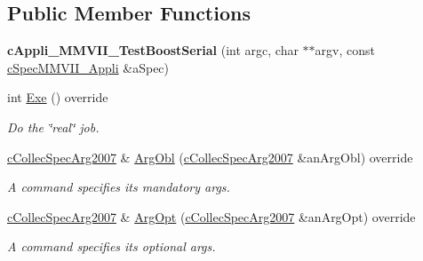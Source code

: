 \subsection*{Public Member Functions}
\begin{DoxyCompactItemize}
\item 
{\bfseries c\+Appli\+\_\+\+M\+M\+V\+I\+I\+\_\+\+Test\+Boost\+Serial} (int argc, char $\ast$$\ast$argv, const \hyperlink{classMMVII_1_1cSpecMMVII__Appli}{c\+Spec\+M\+M\+V\+I\+I\+\_\+\+Appli} \&a\+Spec)\hypertarget{classMMVII_1_1cAppli__MMVII__TestBoostSerial_a9e75f65808b709029bb69c396f045b39}{}\label{classMMVII_1_1cAppli__MMVII__TestBoostSerial_a9e75f65808b709029bb69c396f045b39}

\item 
int \hyperlink{classMMVII_1_1cAppli__MMVII__TestBoostSerial_affa4a77e058fd120dc680f382a9235aa}{Exe} () override\hypertarget{classMMVII_1_1cAppli__MMVII__TestBoostSerial_affa4a77e058fd120dc680f382a9235aa}{}\label{classMMVII_1_1cAppli__MMVII__TestBoostSerial_affa4a77e058fd120dc680f382a9235aa}

\begin{DoxyCompactList}\small\item\em Do the \char`\"{}real\char`\"{} job. \end{DoxyCompactList}\item 
\hyperlink{classMMVII_1_1cCollecSpecArg2007}{c\+Collec\+Spec\+Arg2007} \& \hyperlink{classMMVII_1_1cAppli__MMVII__TestBoostSerial_ac904ed1a77276aa41e05202e1facc03a}{Arg\+Obl} (\hyperlink{classMMVII_1_1cCollecSpecArg2007}{c\+Collec\+Spec\+Arg2007} \&an\+Arg\+Obl) override\hypertarget{classMMVII_1_1cAppli__MMVII__TestBoostSerial_ac904ed1a77276aa41e05202e1facc03a}{}\label{classMMVII_1_1cAppli__MMVII__TestBoostSerial_ac904ed1a77276aa41e05202e1facc03a}

\begin{DoxyCompactList}\small\item\em A command specifies its mandatory args. \end{DoxyCompactList}\item 
\hyperlink{classMMVII_1_1cCollecSpecArg2007}{c\+Collec\+Spec\+Arg2007} \& \hyperlink{classMMVII_1_1cAppli__MMVII__TestBoostSerial_a15fd045b3bc6198ec9848d3652243582}{Arg\+Opt} (\hyperlink{classMMVII_1_1cCollecSpecArg2007}{c\+Collec\+Spec\+Arg2007} \&an\+Arg\+Opt) override\hypertarget{classMMVII_1_1cAppli__MMVII__TestBoostSerial_a15fd045b3bc6198ec9848d3652243582}{}\label{classMMVII_1_1cAppli__MMVII__TestBoostSerial_a15fd045b3bc6198ec9848d3652243582}

\begin{DoxyCompactList}\small\item\em A command specifies its optional args. \end{DoxyCompactList}\end{DoxyCompactItemize}
